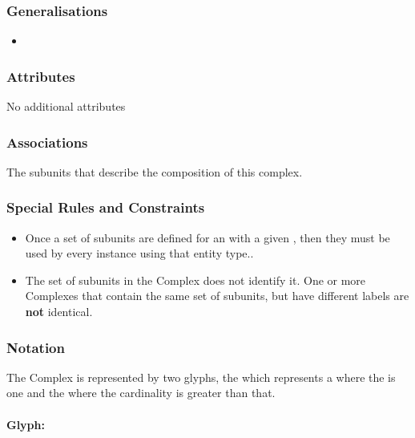 \subsubsection{Generalisations}

\begin{itemize}
\item {}
\end{itemize}

\subsubsection{Attributes}

No additional attributes

\subsubsection{Associations}

\begin{attributes}
   The subunits that describe
  the composition of this complex.
 \end{attributes}


\subsubsection{Special Rules and Constraints}

\begin{itemize}
\item Once a set of subunits are defined for an 
  with a given , then they must be used by every
  instance using that entity type..
\item The set of subunits in the Complex does not identify it. One or
  more Complexes that contain the same set of subunits, but have
  different labels are \textbf{not} identical.
\end{itemize}

\subsubsection{Notation}

The Complex is represented by two glyphs, the 
which represents a  where the 
is one and the  where the cardinality is
greater than that.

\paragraph{Glyph: }

